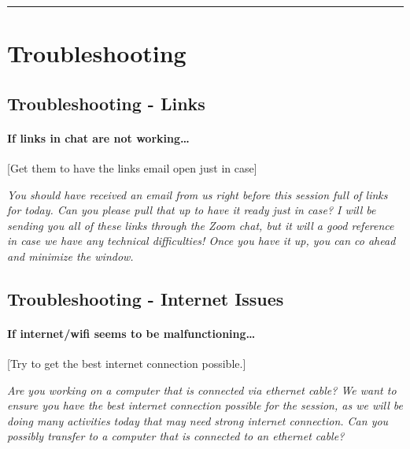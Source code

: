 \documentclass[]{book}
\begin{document}
\begin{center}\rule{0.5\linewidth}{0.5pt}\end{center}

\hypertarget{troubleshooting}{%
\chapter{Troubleshooting}\label{troubleshooting}}

\hypertarget{troubleshooting---links}{%
\section{Troubleshooting - Links}\label{troubleshooting---links}}

\hypertarget{if-links-in-chat-are-not-working}{%
\subsubsection{If links in chat are not working\ldots{}}\label{if-links-in-chat-are-not-working}}

{[}Get them to have the links email open just in case{]}

\emph{You should have received an email from us right before this session full of links for today. Can you please pull that up to have it ready just in case? I will be sending you all of these links through the Zoom chat, but it will a good reference in case we have any technical difficulties! Once you have it up, you can co ahead and minimize the window.}

\hypertarget{troubleshooting---internet-issues}{%
\section{Troubleshooting - Internet Issues}\label{troubleshooting---internet-issues}}

\hypertarget{if-internetwifi-seems-to-be-malfunctioning}{%
\subsubsection{If internet/wifi seems to be malfunctioning\ldots{}}\label{if-internetwifi-seems-to-be-malfunctioning}}

{[}Try to get the best internet connection possible.{]}

\emph{Are you working on a computer that is connected via ethernet cable? We want to ensure you have the best internet connection possible for the session, as we will be doing many activities today that may need strong internet connection. Can you possibly transfer to a computer that is connected to an ethernet cable?}
\end{document}
